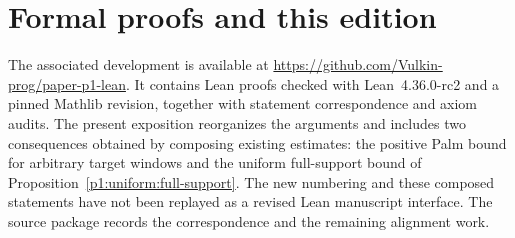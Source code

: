 \section*{Formal proofs and this edition}
The associated development is available at
\url{https://github.com/Vulkin-prog/paper-p1-lean}.
It contains Lean proofs checked with Lean~4.36.0-rc2 and a pinned
Mathlib revision, together with statement correspondence and axiom audits.
The present exposition reorganizes the arguments and includes two
consequences obtained by composing existing estimates: the positive
Palm bound for arbitrary target windows and the uniform full-support
bound of Proposition~\ref{p1:uniform:full-support}.
The new numbering and these composed statements have not been replayed
as a revised Lean manuscript interface. The source package records the
correspondence and the remaining alignment work.
